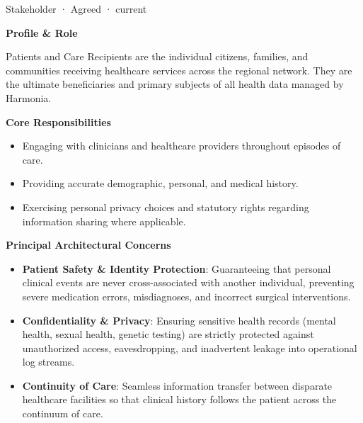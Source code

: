 \label{element:ea5a315450ce4cfb87417263560c2b6d}
{\small Stakeholder · Agreed · current}\par

\par\medskip\textbf{Profile \& Role}\par


Patients and Care Recipients are the individual citizens, families, and communities receiving healthcare services across the regional network. They are the ultimate beneficiaries and primary subjects of all health data managed by Harmonia.



\par\medskip\textbf{Core Responsibilities}\par


\begin{itemize}


\item Engaging with clinicians and healthcare providers throughout episodes of care.

\item Providing accurate demographic, personal, and medical history.

\item Exercising personal privacy choices and statutory rights regarding information sharing where applicable.

\end{itemize}


\par\medskip\textbf{Principal Architectural Concerns}\par


\begin{itemize}


\item \textbf{Patient Safety \& Identity Protection}: Guaranteeing that personal clinical events are never cross-associated with another individual, preventing severe medication errors, misdiagnoses, and incorrect surgical interventions.

\item \textbf{Confidentiality \& Privacy}: Ensuring sensitive health records (mental health, sexual health, genetic testing) are strictly protected against unauthorized access, eavesdropping, and inadvertent leakage into operational log streams.

\item \textbf{Continuity of Care}: Seamless information transfer between disparate healthcare facilities so that clinical history follows the patient across the continuum of care.

\end{itemize}

